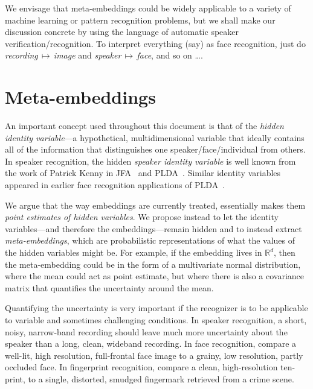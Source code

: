 \documentclass[a4paper,oneside,12pt,english]{report}
\def\R{\mathbb{R}}
\begin{document}
We envisage that meta-embeddings could be widely applicable to a variety of machine learning or pattern recognition problems, but we shall make our discussion concrete by using the language of automatic speaker verification/recognition. To interpret everything (say) as face recognition, just do \emph{recording}$\,\mapsto\,$\emph{image} and \emph{speaker}$\,\mapsto\,$\emph{face}, and so on \ldots.

\section{Meta-embeddings}
An important concept used throughout this document is that of the \emph{hidden identity variable}---a hypothetical, multidimensional variable that ideally contains all of the information that distinguishes one speaker/face/individual from others. In speaker recognition, the hidden \emph{speaker identity variable} is well known from the work of Patrick Kenny in JFA~\cite{JFA} and PLDA~\cite{HTPLDA}. Similar identity variables appeared in earlier face recognition applications of PLDA~\cite{PLDA-IOFFE, PLDA-Prince, PLDA-Li}.

We argue that the way embeddings are currently treated, essentially makes them \emph{point estimates of hidden variables}. We propose instead to let the identity variables---and therefore the embeddings---remain hidden and to instead extract \emph{meta-embeddings}, which are probabilistic representations of what the values of the hidden variables might be. For example, if the embedding lives in $\R^d$, then the meta-embedding could be in the form of a multivariate normal distribution, where the mean could act as point estimate, but where there is also a covariance matrix that quantifies the uncertainty around the mean. 

Quantifying the uncertainty is very important if the recognizer is to be applicable to variable and sometimes challenging conditions. In speaker recognition, a short, noisy, narrow-band recording should leave much more uncertainty about the speaker than a long, clean, wideband recording. In face recognition, compare a well-lit, high resolution, full-frontal face image to a grainy, low resolution, partly occluded face. In fingerprint recognition, compare a clean, high-resolution ten-print, to a single, distorted, smudged fingermark retrieved from a crime scene.    
\end{document}
